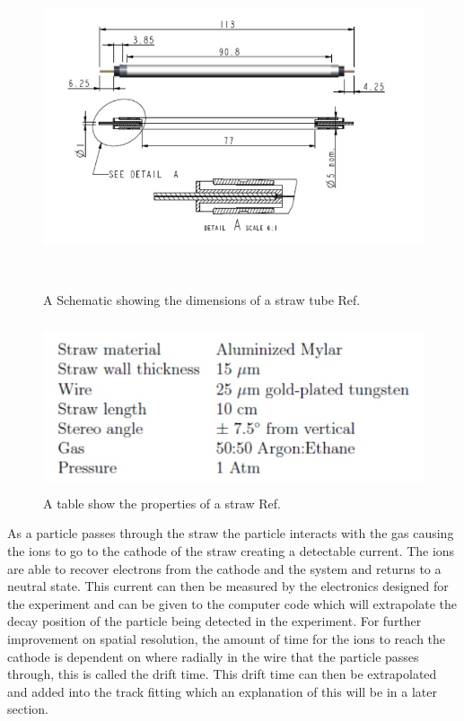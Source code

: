 \documentclass[./Thesis]{subfiles}
\begin{document}
\begin{figure}
	\centerline{\includegraphics[height=95mm]{StrawTube.jpeg}}
	\caption[ Schematic of Straw Tube]{ A Schematic showing the dimensions of a straw tube Ref. \cite{aepps}
	}
	\label{fig:StrawTube}
\end{figure}

\begin{figure}
	\centerline{\includegraphics[height=50mm]{StrawProperties.jpeg}}
	\caption[ Table of Straw Properties]{ A table show the properties of a straw Ref. \cite{aepps}
	}
	\label{fig:StrawProperties}
\end{figure}
	
	As a particle passes through the straw the particle interacts with the gas causing the ions to go to the cathode of the straw creating a detectable current.  The ions are able to recover electrons from the cathode and the system and returns to a neutral state.  This current can then be measured by the electronics designed for the experiment and can be given to the computer code which will extrapolate the decay position of the particle being detected in the experiment.  For further improvement on spatial resolution, the amount of time for the ions to reach the cathode is dependent on where radially in the wire that the particle passes through, this is called the drift time.  This drift time can then be extrapolated and added into the track fitting which an explanation of this will be in a later section.  
	 
\end{document}
